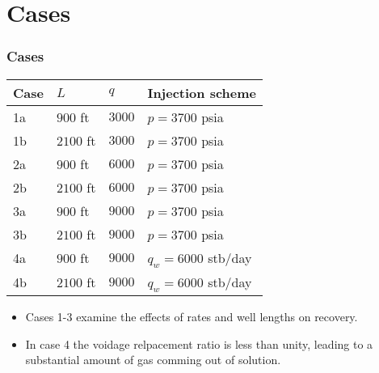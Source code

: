 
\section{Cases}
\begin{frame}
    \frametitle{Cases}
    \begin{center}
        \begin{tabular}{llll}
            \toprule
            \textbf{Case} & \textbf{$L$} & \textbf{$q$} & \textbf{Injection scheme} \\
            \midrule
            1a            & $900$ ft                   & $3000$                          & $p = 3700$ psia           \\
            1b            & $2100$ ft                  & $3000$                          & $p = 3700$ psia           \\
            2a            & $900$ ft                   & $6000$                          & $p = 3700$ psia           \\
            2b            & $2100$ ft                  & $6000$                          & $p = 3700$ psia           \\
            3a            & $900$ ft                   & $9000$                          & $p = 3700$ psia           \\
            3b            & $2100$ ft                  & $9000$                          & $p = 3700$ psia           \\
            4a            & $900$ ft                   & $9000$                          & $q_w = 6000$ stb/day      \\
            4b            & $2100$ ft                  & $9000$                          & $q_w = 6000$ stb/day      \\
            \bottomrule
        \end{tabular}
    \end{center}

    \begin{itemize}
        \item Cases 1-3 examine the effects of rates and well lengths on recovery.
        \item In case 4 the voidage relpacement ratio is less than unity, leading to a substantial amount of gas comming out of solution.
    \end{itemize}
\end{frame}